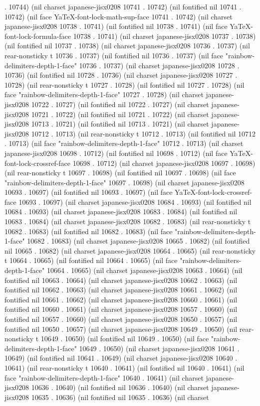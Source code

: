 . 10744) (nil charset japanese-jisx0208 10741 . 10742) (nil fontified nil 10741 . 10742) (nil face YaTeX-font-lock-math-sup-face 10741 . 10742) (nil charset japanese-jisx0208 10738 . 10741) (nil fontified nil 10738 . 10741) (nil face YaTeX-font-lock-formula-face 10738 . 10741) (nil charset japanese-jisx0208 10737 . 10738) (nil fontified nil 10737 . 10738) (nil charset japanese-jisx0208 10736 . 10737) (nil rear-nonsticky t 10736 . 10737) (nil fontified nil 10736 . 10737) (nil face "rainbow-delimiters-depth-1-face" 10736 . 10737) (nil charset japanese-jisx0208 10728 . 10736) (nil fontified nil 10728 . 10736) (nil charset japanese-jisx0208 10727 . 10728) (nil rear-nonsticky t 10727 . 10728) (nil fontified nil 10727 . 10728) (nil face "rainbow-delimiters-depth-1-face" 10727 . 10728) (nil charset japanese-jisx0208 10722 . 10727) (nil fontified nil 10722 . 10727) (nil charset japanese-jisx0208 10721 . 10722) (nil fontified nil 10721 . 10722) (nil charset japanese-jisx0208 10713 . 10721) (nil fontified nil 10713 . 10721) (nil charset japanese-jisx0208 10712 . 10713) (nil rear-nonsticky t 10712 . 10713) (nil fontified nil 10712 . 10713) (nil face "rainbow-delimiters-depth-1-face" 10712 . 10713) (nil charset japanese-jisx0208 10698 . 10712) (nil fontified nil 10698 . 10712) (nil face YaTeX-font-lock-crossref-face 10698 . 10712) (nil charset japanese-jisx0208 10697 . 10698) (nil rear-nonsticky t 10697 . 10698) (nil fontified nil 10697 . 10698) (nil face "rainbow-delimiters-depth-1-face" 10697 . 10698) (nil charset japanese-jisx0208 10693 . 10697) (nil fontified nil 10693 . 10697) (nil face YaTeX-font-lock-crossref-face 10693 . 10697) (nil charset japanese-jisx0208 10684 . 10693) (nil fontified nil 10684 . 10693) (nil charset japanese-jisx0208 10683 . 10684) (nil fontified nil 10683 . 10684) (nil charset japanese-jisx0208 10682 . 10683) (nil rear-nonsticky t 10682 . 10683) (nil fontified nil 10682 . 10683) (nil face "rainbow-delimiters-depth-1-face" 10682 . 10683) (nil charset japanese-jisx0208 10665 . 10682) (nil fontified nil 10665 . 10682) (nil charset japanese-jisx0208 10664 . 10665) (nil rear-nonsticky t 10664 . 10665) (nil fontified nil 10664 . 10665) (nil face "rainbow-delimiters-depth-1-face" 10664 . 10665) (nil charset japanese-jisx0208 10663 . 10664) (nil fontified nil 10663 . 10664) (nil charset japanese-jisx0208 10662 . 10663) (nil fontified nil 10662 . 10663) (nil charset japanese-jisx0208 10661 . 10662) (nil fontified nil 10661 . 10662) (nil charset japanese-jisx0208 10660 . 10661) (nil fontified nil 10660 . 10661) (nil charset japanese-jisx0208 10657 . 10660) (nil fontified nil 10657 . 10660) (nil charset japanese-jisx0208 10650 . 10657) (nil fontified nil 10650 . 10657) (nil charset japanese-jisx0208 10649 . 10650) (nil rear-nonsticky t 10649 . 10650) (nil fontified nil 10649 . 10650) (nil face "rainbow-delimiters-depth-1-face" 10649 . 10650) (nil charset japanese-jisx0208 10641 . 10649) (nil fontified nil 10641 . 10649) (nil charset japanese-jisx0208 10640 . 10641) (nil rear-nonsticky t 10640 . 10641) (nil fontified nil 10640 . 10641) (nil face "rainbow-delimiters-depth-1-face" 10640 . 10641) (nil charset japanese-jisx0208 10636 . 10640) (nil fontified nil 10636 . 10640) (nil charset japanese-jisx0208 10635 . 10636) (nil fontified nil 10635 . 10636) (nil charset 